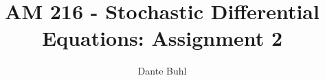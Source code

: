 \documentclass{article}
\begin{document}
\title{AM 216 - Stochastic Differential Equations: Assignment 2}
\author{Dante Buhl}


\newcommand{\wrms}{w_{\text{rms}}}
\newcommand{\bs}[1]{\boldsymbol{#1}}
\newcommand{\tb}[1]{\textbf{#1}}
\newcommand{\bmp}[1]{\begin{minipage}{#1\textwidth}}
\newcommand{\emp}{\end{minipage}}
\newcommand{\R}{\mathbb{R}}
\newcommand{\C}{\mathbb{C}}
\newcommand{\N}{\mathcal{N}}
\newcommand{\Var}{\text{Var}}
\newcommand{\Cov}{\text{Cov}}
\newcommand{\Bino}{\text{Bino}}
\newcommand{\Norm}{\mathcal{N}}
\newcommand{\erf}{\text{erf}}
\newcommand{\m}{\bs{\mu}_*}
\newcommand{\s}{\bs{\Sigma}_*}
\newcommand{\dt}{\Delta t}
\newcommand{\dx}{\Delta x}
\newcommand{\tr}[1]{\text{Tr}(#1)}
\newcommand{\Tr}[1]{\text{Tr}(#1)}
\newcommand{\Div}{\nabla \cdot}
\renewcommand{\div}{\nabla \cdot}
\newcommand{\Curl}{\nabla \times}
\newcommand{\Grad}{\nabla}
\newcommand{\grad}{\nabla}
\newcommand{\grads}{\nabla_s}
\newcommand{\gradf}{\nabla_f}
\newcommand{\xs}{x_s}
\newcommand{\x}{\bs{x}}
\newcommand{\xf}{x_f}
\newcommand{\ts}{t_s}
\newcommand{\tf}{t_f}
\newcommand{\pt}{\partial t}
\newcommand{\pz}{\partial z}
\newcommand{\uvec}{\bs{u}}
\newcommand{\bvec}{\bs{B}}
\newcommand{\nvec}{\hat{\bs{n}}}
\newcommand{\tu}{\tilde{\uvec}}
\newcommand{\B}{\bs{B}}
\newcommand{\A}{\bs{A}}
\newcommand{\jvec}{\bs{j}}
\newcommand{\F}{\bs{F}}
\newcommand{\T}{\tilde{T}}
\newcommand{\ez}{\bs{e}_z}
\newcommand{\ex}{\bs{e}_x}
\newcommand{\ey}{\bs{e}_y}
\newcommand{\eo}{\bs{e}_{\bs{\Omega}}}
\newcommand{\ppt}[1]{\frac{\partial #1}{\partial t}}
\newcommand{\pp}[2]{\frac{\partial #1}{\partial #2}}
\newcommand{\pptwo}[2]{\frac{\partial^2 #1}{\partial #2^2}}
\newcommand{\ddtwo}[2]{\frac{d^2 #1}{d #2^2}}
\newcommand{\DDt}[1]{\frac{D #1}{D t}}
\newcommand{\ppts}[1]{\frac{\partial #1}{\partial t_s}}
\newcommand{\pptf}[1]{\frac{\partial #1}{\partial t_f}}
\newcommand{\ppz}[1]{\frac{\partial #1}{\partial z}}
\newcommand{\ddz}[1]{\frac{d #1}{d z}}
\newcommand{\ppzetas}[1]{\frac{\partial^2 #1}{\partial \zeta^2}}
\newcommand{\ppzs}[1]{\frac{\partial #1}{\partial z_s}}
\newcommand{\ppzf}[1]{\frac{\partial #1}{\partial z_f}}
\newcommand{\ppx}[1]{\frac{\partial #1}{\partial x}}
\newcommand{\ddx}[1]{\frac{d #1}{d x}}
\newcommand{\ppxi}[1]{\frac{\partial #1}{\partial x_i}}
\newcommand{\ppxj}[1]{\frac{\partial #1}{\partial x_j}}
\newcommand{\ppy}[1]{\frac{\partial #1}{\partial y}}
\newcommand{\ppzeta}[1]{\frac{\partial #1}{\partial \zeta}}
\renewcommand{\k}{\bs{k}}
\newcommand{\real}[1]{\text{Re}\left[#1\right]}
\end{document}
